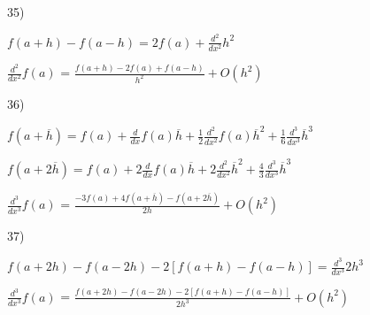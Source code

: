 \documentclass[]{article}
\begin{document}
35) 

\enspace

$f(a + h) - f(a - h) = 2f(a) + \frac{d^2}{dx^2} h^2$

\enspace

$\frac{d^2}{dx^2} f(a)$ = $\frac{f(a+h) - 2f(a) + f(a-h)}{h^2} + O(h^2)$

\enspace

36)

\enspace

$f(a + \overline{h}) = f(a) + \frac{d}{dx} f(a)\overline{h} + \frac{1}{2} \frac{d^2}{dx^2} f(a) \overline{h}^2 + \frac{1}{6} \frac{d^3}{dx^3} \overline{h}^3$

\enspace

$f(a + 2\overline{h}) = f(a) + 2\frac{d}{dx} f(a) \overline{h} + 2\frac{d^2}{dx^2} \overline{h}^2 + \frac{4}{3} \frac{d^3}{dx^3} \overline{h}^3$

\enspace

$\frac{d^3}{dx^3} f(a)$ = $\frac{-3f(a)+4f(a+\overline{h})-f(a+2\overline{h})}{2h} + O(h^2)$

\enspace

37)

\enspace

$f(a + 2h) - f(a - 2h) - 2[f(a + h) - f(a - h)] = \frac{d^3}{dx^3} 2h^3$

\enspace

$\frac{d^3}{dx^3} f(a)$ = $\frac{f(a + 2h) - f(a - 2h) - 2[f(a + h) - f(a - h)]}{2h^3} + O(h^2)$
\end{document}
